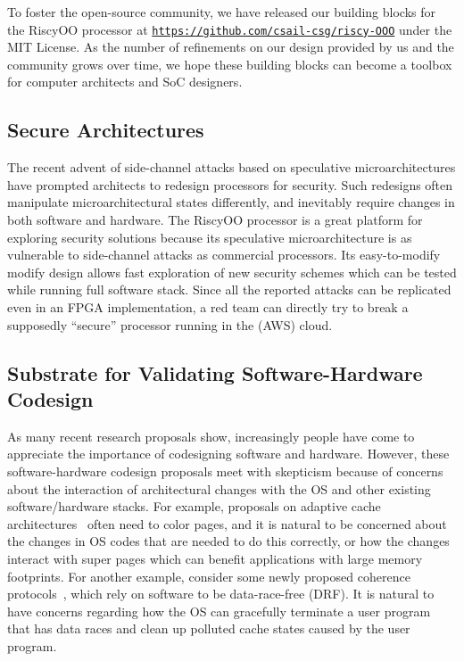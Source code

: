 \documentclass[conference]{IEEEtran}
\begin{document}
To foster the open-source community, we have released our building blocks for the RiscyOO processor at \texttt{\url{https://github.com/csail-csg/riscy-OOO}} under the MIT License.
As the number of refinements on our design provided by us and the community grows over time, we hope these building blocks can become a toolbox for computer architects and SoC designers.

\subsection{Secure Architectures}
The recent advent of side-channel attacks based on speculative microarchitectures have prompted architects to redesign processors for security.
Such redesigns often manipulate microarchitectural states differently, and inevitably require changes in both software and hardware.
The RiscyOO processor is a great platform for exploring security solutions because its speculative microarchitecture is as vulnerable to side-channel attacks as commercial processors.
Its easy-to-modify modify design allows fast exploration of new security schemes which can be tested while running full software stack.
Since all the reported attacks can be replicated even in an FPGA implementation, a red team can directly try to break a supposedly ``secure'' processor running in the (AWS) cloud. 


\subsection{Substrate for Validating Software-Hardware Codesign}

As many recent research proposals show, increasingly people have come to appreciate the importance of codesigning software and hardware.
However, these software-hardware codesign proposals meet with skepticism because of concerns about the interaction of architectural changes with the OS and other existing software/hardware stacks.
For example, proposals on adaptive cache architectures~\cite{Jigsaw} often need to color pages, and it is natural to be concerned about the changes in OS codes that are needed to do this correctly, or how the changes interact with super pages which can benefit applications with large memory footprints.
For another example, consider some newly proposed coherence protocols~\cite{DeNoVo}, which rely on software to be data-race-free (DRF). It is natural to have concerns regarding how the OS can gracefully terminate a user program that has data races and clean up polluted cache states caused by the user program.
\end{document}
